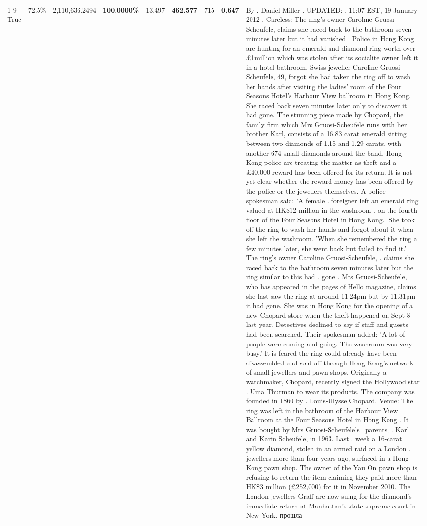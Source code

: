 \begin{table}[H]
\begin{tabular}{lllrlllll}
\cline{1-9}
True & 72.5\% & 2,110,636.2494 & \bfseries \color{red} 100.0000\% & 13.497 & \bfseries \color{red} 462.577 & 715 & \bfseries \color{red} 0.647 & By . Daniel Miller . UPDATED: . 11:07 EST, 19 January 2012 . Careless: The ring's owner Caroline Gruosi-Scheufele, claims she raced back to the bathroom seven minutes later but it had vanished . Police in Hong Kong are hunting for an emerald and diamond ring worth over £1million which was stolen after its socialite owner left it in a hotel bathroom. Swiss jeweller Caroline Gruosi-Scheufele, 49, forgot she had taken the ring off to wash her hands after visiting the ladies' room of the Four Seasons Hotel's Harbour View ballroom in Hong Kong. She raced back seven minutes later only to discover it had gone. The stunning piece made by Chopard, the family firm which Mrs Gruosi-Scheufele runs with her brother Karl, consists of a 16.83 carat emerald sitting between two diamonds of 1.15 and 1.29 carats, with another 674 small diamonds around the band. Hong Kong police are treating the matter as theft and a £40,000 reward has been offered for its return. It is not yet clear whether the reward money has been offered by the police or the jewellers themselves. A police spokesman said: 'A female . foreigner left an emerald ring valued at HK\$12 million in the washroom . on the fourth floor of the Four Seasons Hotel in Hong Kong. 'She took off the ring to wash her hands and forgot about it when she left the washroom. 'When she remembered the ring a few minutes later, she went back but failed to find it.' The ring's owner Caroline Gruosi-Scheufele, . claims she raced back to the bathroom seven minutes later but the ring similar to this had . gone . Mrs Gruosi-Scheufele, who has appeared in the pages of Hello magazine, claims she last saw the ring at around 11.24pm but by 11.31pm it had gone. She was in Hong Kong for the opening of a new Chopard store when the theft happened on Sept 8 last year. Detectives declined to say if staff and guests had been searched. Their spokesman added: 'A lot of people were coming and going. The washroom was very busy.' It is feared the ring could already have been disassembled and sold off through Hong Kong's network of small jewellers and pawn shops. Originally a watchmaker, Chopard, recently signed the Hollywood star . Uma Thurman to wear its products. The company was founded in 1860 by . Louis-Ulysse Chopard. Venue: The ring was left in the bathroom of the Harbour View Ballroom at the Four Seasons Hotel in Hong Kong . It was bought by Mrs Gruosi-Scheufele's  parents, . Karl and Karin Scheufele, in 1963. Last . week a 16-carat yellow diamond, stolen in an armed raid on a London . jewellers more than four years ago, surfaced in a Hong Kong pawn shop. The owner of the Yau On pawn shop is refusing to return the item claiming they paid more than HK\$3 million (£252,000) for it in November 2010. The London jewellers Graff are now suing for the diamond’s immediate return at Manhattan’s state supreme court in New York. прошла \\

\end{tabular}
\end{table}
